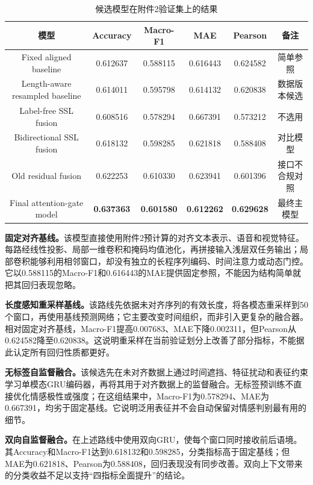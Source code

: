 \documentclass{gmcmthesis}
\newcommand{\keymetric}[1]{\textbf{#1}}
\begin{document}
\begin{table}[H]
\centering
\small
\caption{候选模型在附件2验证集上的结果}
\label{tab:candidates}
\begin{tabular}{cccccc}
\toprule
模型 & Accuracy & Macro-F1 & MAE & Pearson & 备注 \\
\midrule
Fixed aligned baseline & 0.612637 & 0.588115 & 0.616443 & 0.624582 & 简单参照 \\
Length-aware resampled baseline & 0.614011 & 0.595798 & 0.614132 & 0.620838 & 数据版本候选 \\
Label-free SSL fusion & 0.608516 & 0.578294 & 0.667391 & 0.573212 & 不选用 \\
Bidirectional SSL fusion & 0.618132 & 0.598285 & 0.621818 & 0.588408 & 对比模型 \\
Old residual fusion & 0.622253 & 0.610330 & 0.623941 & 0.601396 & 接口不合规对照 \\
Final attention-gate model & \keymetric{0.637363} & \keymetric{0.601580} & \keymetric{0.612262} & \keymetric{0.629628} & 最终主模型 \\
\bottomrule
\end{tabular}
\end{table}

\par\indent\textbf{固定对齐基线。}该模型直接使用附件2预计算的对齐文本表示、语音和视觉特征。每路经线性投影、局部一维卷积和掩码均值池化，再拼接输入浅层双任务输出；局部卷积能够利用相邻窗口，却没有独立的长程序列编码、时间注意力或动态门控。它以0.588115的Macro-F1和0.616443的MAE提供固定参照，不能因为结构简单就把其回归表现忽略。

\par\indent\textbf{长度感知重采样基线。}该路线先依据未对齐序列的有效长度，将各模态重采样到50个窗口，再使用基线预测网络；它主要改变时间组织，而非引入更复杂的融合器。相对固定对齐基线，Macro-F1提高0.007683、MAE下降0.002311，但Pearson从0.624582降至0.620838。这说明重采样在当前验证划分上改善了部分指标，不能据此认定所有回归性质都更好。

\par\indent\textbf{无标签自监督融合。}该候选先在未对齐数据上通过时间遮挡、特征扰动和表征约束学习单模态GRU编码器，再将其用于对齐数据上的监督融合。无标签预训练不直接优化情感极性或强度；在这组结果中，Macro-F1为0.578294、MAE为0.667391，均劣于固定基线。它说明泛用表征并不会自动保留对情感判别最有用的细节。

\par\indent\textbf{双向自监督融合。}在上述路线中使用双向GRU，使每个窗口同时接收前后语境。其Accuracy和Macro-F1达到0.618132和0.598285，分类指标高于固定基线；但MAE为0.621818、Pearson为0.588408，回归表现没有同步改善。双向上下文带来的分类收益不足以支持“四指标全面提升”的结论。
\end{document}
